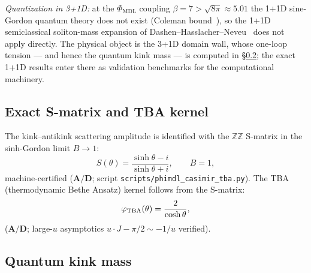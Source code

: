 \documentclass[11pt]{article}
\theoremstyle{remark}
\newcommand{\PHIMDL}{\Phi_{\mathrm{MDL}}}
\newcommand{\CatAD}{\textbf{A/D}}
\begin{document}
\noindent\textit{Quantization in 3+1D:} at the $\PHIMDL$ coupling $\beta = 7 >
\sqrt{8\pi}\approx5.01$ the 1+1D sine-Gordon quantum theory does not exist
(Coleman bound~\cite{Coleman1975}), so the 1+1D semiclassical soliton-mass
expansion of Dashen--Hasslacher--Neveu~\cite{DashenHasslacherNeveu1975} does not
apply directly.  The physical object is the 3+1D domain wall, whose one-loop
tension --- and hence the quantum kink mass --- is computed in
\S\ref{ssec:casimir}; the exact 1+1D results enter there as validation
benchmarks for the computational machinery.

\subsection{Exact S-matrix and TBA kernel}
\label{ssec:smatrix}

The kink--antikink scattering amplitude is identified with the $\mathbb{Z}\mathbb{Z}$
S-matrix in the sinh-Gordon limit $B\to 1$:
\begin{equation}
  S(\theta) = \frac{\sinh\theta - i}{\sinh\theta + i}, \qquad B = 1,
  \label{eq:zz_smatrix}
\end{equation}
machine-certified ($\CatAD$; script \texttt{scripts/phimdl\_casimir\_tba.py}).
The TBA (thermodynamic Bethe Ansatz) kernel follows from the S-matrix:
\begin{equation}
  \varphi_{\rm TBA}(\theta) = \frac{2}{\cosh\theta},
  \label{eq:tba_kernel}
\end{equation}
($\CatAD$; large-$u$ asymptotics $u\cdot J - \pi/2 \sim -1/u$ verified).

\subsection{Quantum kink mass}
\label{ssec:casimir}
\end{document}
